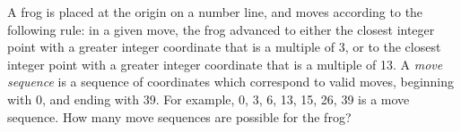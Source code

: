 A frog is placed at the origin on a number line, and moves according to the following rule: in a given move, the frog advanced to either the closest integer point with a greater integer coordinate that is a multiple of 3, or to the closest integer point with a greater integer coordinate that is a multiple of 13.  A \textit{move sequence} is a sequence of coordinates which correspond to valid moves, beginning with 0, and ending with 39.  For example, 0, 3, 6, 13, 15, 26, 39 is a move sequence.  How many move sequences are possible for the frog?